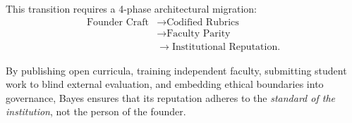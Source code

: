 This transition requires a 4-phase architectural migration:
\begin{equation}
\begin{aligned}
\text{Founder Craft} &\longrightarrow \text{Codified Rubrics} \\
&\longrightarrow \text{Faculty Parity} \\
&\longrightarrow \text{Institutional Reputation}.
\end{aligned}
\end{equation}

By publishing open curricula, training independent faculty, submitting student work to blind external evaluation, and embedding ethical boundaries into governance, Bayes ensures that its reputation adheres to the \emph{standard of the institution}, not the person of the founder.
